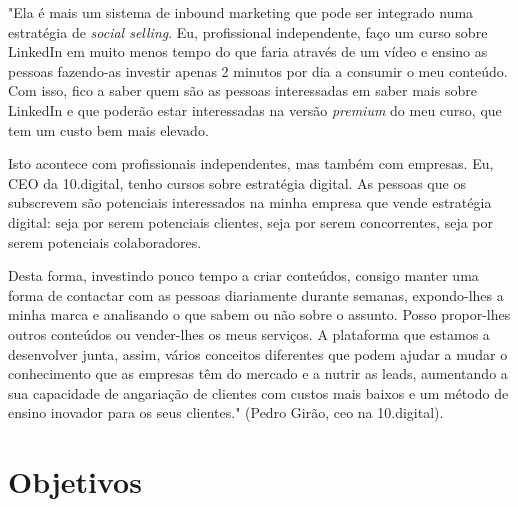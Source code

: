 "Ela é mais um sistema de inbound marketing que pode ser integrado numa estratégia de \textit{\gls{social selling}}. Eu, profissional independente, faço um curso sobre LinkedIn\cite{linkedin} em muito menos tempo do que faria através de um vídeo e ensino as pessoas fazendo-as investir apenas 2 minutos por dia a consumir o meu conteúdo. Com isso, fico a saber quem são as pessoas interessadas em saber mais sobre LinkedIn e que poderão estar interessadas na versão \textit{premium} do meu curso, que tem um custo bem mais elevado.

Isto acontece com profissionais independentes, mas também com empresas. Eu, CEO da 10.digital, tenho cursos sobre estratégia digital. As pessoas que os subscrevem são potenciais interessados na minha empresa que vende estratégia digital: seja por serem potenciais clientes, seja por serem concorrentes, seja por serem potenciais colaboradores.

Desta forma, investindo pouco tempo a criar conteúdos, consigo manter uma forma de contactar com as pessoas diariamente durante semanas, expondo-lhes a minha marca e analisando o que sabem ou não sobre o assunto.
Posso propor-lhes outros conteúdos ou vender-lhes os meus serviços. A plataforma que estamos a desenvolver junta, assim, vários conceitos diferentes que podem ajudar a mudar o conhecimento que as empresas têm do mercado e a nutrir as leads, aumentando a sua capacidade de angariação de clientes com custos mais baixos e um método de ensino inovador para os seus clientes." (Pedro Girão, \acrfull{ceo} na 10.digital).



\section{Objetivos}
\label{subsec:objetivos}

